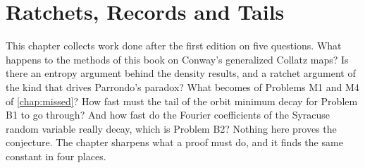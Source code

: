 \providecommand{\rhomin}{\rho_{\min}}
\providecommand{\fl}[1]{\lfloor #1\rfloor}
\providecommand{\ce}[1]{\lceil #1\rceil}
\providecommand{\Cm}{\mathrm{Col}_{\min}}
\chapter{Ratchets, Records and Tails}\label{rrt:chap:ratchets}

\noindent
This chapter collects work done after the first edition on five questions. What happens to the methods of this book on Conway's generalized Collatz maps? Is there an entropy argument behind the density results, and a ratchet argument of the kind that drives Parrondo's paradox? What becomes of Problems M1 and M4 of \cref{chap:missed}? How fast must the tail of the orbit minimum decay for Problem B1 to go through? And how fast do the Fourier coefficients of the Syracuse random variable really decay, which is Problem B2? Nothing here proves the conjecture. The chapter sharpens what a proof must do, and it finds the same constant in four places.


